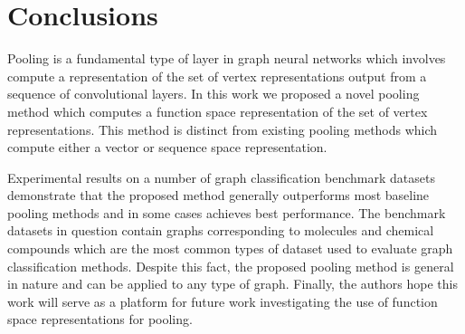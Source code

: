 \documentclass[runningheads]{llncs}
\begin{document}
\section{Conclusions}
\label{sec:conclusions}
Pooling is a fundamental type of layer in graph neural networks which involves compute a representation of the set of vertex representations output from a sequence of convolutional layers. In this work we proposed a novel pooling method which computes a function space representation of the set of vertex representations. This method is distinct from existing pooling methods which compute either a vector or sequence space representation.

Experimental results on a number of graph classification benchmark datasets demonstrate that the proposed method generally outperforms most baseline pooling methods and in some cases achieves best performance. The benchmark datasets in question contain graphs corresponding to molecules and chemical compounds which are the most common types of dataset used to evaluate graph classification methods. Despite this fact, the proposed pooling method is general in nature and can be applied to any type of graph. Finally, the authors hope this work will serve as a platform for future work investigating the use of function space representations for pooling.
\end{document}
